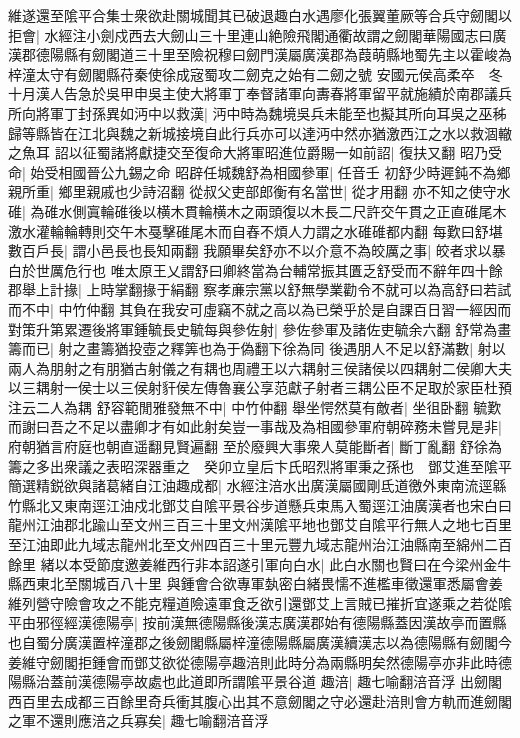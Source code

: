 維遂還至隂平合集士衆欲赴關城聞其已破退趣白水遇廖化張翼董厥等合兵守劒閣以拒會|{
	水經注小劍戍西去大劒山三十里連山絶險飛閣通衢故謂之劒閣華陽國志曰廣漢郡德陽縣有劒閣道三十里至險祝穆曰劒門漢屬廣漢郡為葭萌縣地蜀先主以霍峻為梓潼太守有劒閣縣苻秦使徐成宼蜀攻二劒克之始有二劒之號}
安國元侯高柔卒　冬十月漢人告急於吳甲申吳主使大將軍丁奉督諸軍向夀春將軍留平就施績於南郡議兵所向將軍丁封孫異如沔中以救漢|{
	沔中時為魏境吳兵未能至也擬其所向耳吳之巫秭歸等縣皆在江北與魏之新城接境自此行兵亦可以達沔中然亦猶激西江之水以救涸轍之魚耳}
詔以征蜀諸將獻捷交至復命大將軍昭進位爵賜一如前詔|{
	復扶又翻}
昭乃受命|{
	始受相國晉公九錫之命}
昭辟任城魏舒為相國參軍|{
	任音壬}
初舒少時遲鈍不為鄉親所重|{
	鄉里親戚也少詩沼翻}
從叔父吏部郎衡有名當世|{
	從才用翻}
亦不知之使守水碓|{
	為碓水側寘輪碓後以横木貫輪横木之兩頭復以木長二尺許交午貫之正直碓尾木激水灌輪輪轉則交午木戞擊碓尾木而自舂不煩人力謂之水碓碓都内翻}
每歎曰舒堪數百戶長|{
	謂小邑長也長知兩翻}
我願畢矣舒亦不以介意不為皎厲之事|{
	皎者求以暴白於世厲危行也}
唯太原王乂謂舒曰卿終當為台輔常振其匱乏舒受而不辭年四十餘郡舉上計掾|{
	上時掌翻掾于絹翻}
察孝亷宗黨以舒無學業勸令不就可以為高舒曰若試而不中|{
	中竹仲翻}
其負在我安可虛竊不就之高以為已榮乎於是自課百日習一經因而對策升第累遷後將軍鍾毓長史毓每與參佐射|{
	參佐參軍及諸佐吏毓余六翻}
舒常為畫籌而已|{
	射之畫籌猶投壺之釋筭也為于偽翻下徐為同}
後遇朋人不足以舒滿數|{
	射以兩人為朋射之有朋猶古射儀之有耦也周禮王以六耦射三侯諸侯以四耦射二侯卿大夫以三耦射一侯士以三侯射豻侯左傳魯襄公享范獻子射者三耦公臣不足取於家臣杜預注云二人為耦}
舒容範閒雅發無不中|{
	中竹仲翻}
舉坐愕然莫有敵者|{
	坐徂卧翻}
毓歎而謝曰吾之不足以盡卿才有如此射矣豈一事哉及為相國參軍府朝碎務未嘗見是非|{
	府朝猶言府庭也朝直遥翻見賢遍翻}
至於廢興大事衆人莫能斷者|{
	斷丁亂翻}
舒徐為籌之多出衆議之表昭深器重之　癸卯立皇后卞氏昭烈將軍秉之孫也　鄧艾進至隂平簡選精鋭欲與諸葛緒自江油趣成都|{
	水經注涪水出廣漢屬國剛氐道徼外東南流逕緜竹縣北又東南逕江油戍北鄧艾自隂平景谷步道懸兵束馬入蜀逕江油廣漢者也宋白曰龍州江油郡北踰山至文州三百三十里文州漢隂平地也鄧艾自隂平行無人之地七百里至江油即此九域志龍州北至文州四百三十里元豐九域志龍州治江油縣南至綿州二百餘里}
緒以本受節度邀姜維西行非本詔遂引軍向白水|{
	此白水關也賢曰在今梁州金牛縣西東北至關城百八十里}
與鍾會合欲專軍埶密白緒畏懦不進檻車徵還軍悉屬會姜維列營守險會攻之不能克糧道險遠軍食乏欲引還鄧艾上言賊已摧折宜遂乘之若從隂平由邪徑經漢德陽亭|{
	按前漢無德陽縣後漢志廣漢郡始有德陽縣蓋因漢故亭而置縣也自蜀分廣漢置梓潼郡之後劒閣縣屬梓潼德陽縣屬廣漢續漢志以為德陽縣有劒閣今姜維守劒閣拒鍾會而鄧艾欲從德陽亭趣涪則此時分為兩縣明矣然德陽亭亦非此時德陽縣治蓋前漢德陽亭故處也此道即所謂隂平景谷道}
趣涪|{
	趣七喻翻涪音浮}
出劒閣西百里去成都三百餘里奇兵衝其腹心出其不意劒閣之守必還赴涪則會方軌而進劒閣之軍不還則應涪之兵寡矣|{
	趣七喻翻涪音浮}
